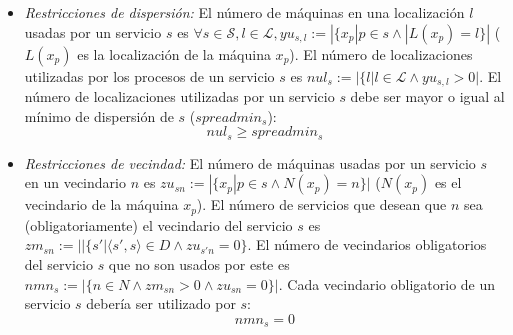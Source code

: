 \documentclass[../informe2.tex]{subfiles}
\begin{document}
\begin{itemize}
	\item\textit{Restricciones de dispersión:} El número de máquinas en una localización $l$ usadas por un servicio $s$ es $\forall s \in \mathcal{S}, l \in \mathcal{L},yu_{s,l}:=|\{x_p|p\in s \wedge|L(x_p)=l\}|$ ($L(x_p)$ es la localización de la máquina $x_p$). El número de localizaciones utilizadas por los procesos de un servicio $s$ es $nul_{s}:=|\{l|l\in \mathcal{L}\wedge yu_{s,l}>0|$. El número de localizaciones utilizadas por un servicio $s$ debe ser mayor o igual al mínimo de dispersión de $s$ ($spreadmin_s$):
		\begin{equation}\label{modelo2:r4}
			nul_s \geq spreadmin_s
		\end{equation}
	\item\textit{Restricciones de vecindad:} El número de máquinas usadas por un servicio $s$ en un vecindario $n$ es $zu_{sn}:=|\{x_p|p\in s \wedge N(x_p)=n\}|$ ($N(x_p)$ es el vecindario de la máquina $x_p$). El número de servicios que desean que $n$ sea (obligatoriamente) el vecindario del servicio $s$ es $zm_{sn}:=||\{s'|\langle s',s\rangle \in D \wedge zu_{s'n}=0\}$. El número de vecindarios obligatorios del servicio $s$ que no son usados por este es $nmn_s:=|\{n \in N \wedge zm_{sn} > 0 \wedge zu_{sn} = 0 \}|$. Cada vecindario obligatorio de un servicio $s$ debería ser utilizado por $s$:
	\begin{equation}\label{modelo2:r5}
		nmn_s = 0
	\end{equation}

\end{itemize}
\end{document}
